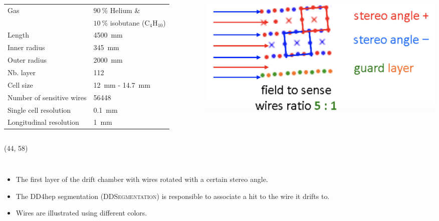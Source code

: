 \documentclass[final,xcolor={dvipsnames,svgnames,x11names,table}]{beamer}
\begin{document}
\begin{frame}
\begin{textblock}{43}
\begin{tcolorbox}[title=The drift chamber]
\begin{columns}
      \centering
      \begin{adjustbox}{max width=0.8\textwidth}
        \begin{tabular}{l l}
          \toprule
            Gas & $90~\%$ Helium \&\\
            & $10~\%$ isobutane ($\text{C}_{4}\text{H}_{10}$) \\
            Length & 4500~mm \\
            Inner radius & 345~mm \\
            Outer radius & 2000~mm\\
            Nb. layer & 112 \\
            Cell size & 12~mm - 14.7~mm \\
            Number of sensitive wires & 56448 \\
            Single cell resolution & 0.1~mm \\
            Longitudinal resolution & 1~mm \\
          \bottomrule
        \end{tabular}
      \end{adjustbox}

      \centering
      \includegraphics[width=\textwidth]{Figures/Field_sensWires.png}

    \end{columns}


  \end{tcolorbox}
\end{textblock}


\begin{textblock}{39.5}(44, 58)
  \begin{tcolorbox}[title=The simulation of the drift chamber with FCCSW]

    \begin{columns}
      \begin{itemize}
        \item The first layer of the drift chamber with wires rotated with a certain stereo angle.
        \item The DD4hep segmentation (\textsc{DDSegmentation}) is responsible to associate a hit to the wire it drifts to.
        \item Wires are illustrated using different colors.
      \end{itemize}


\end{columns}
\end{tcolorbox}
\end{textblock}
\end{frame}
\end{document}
